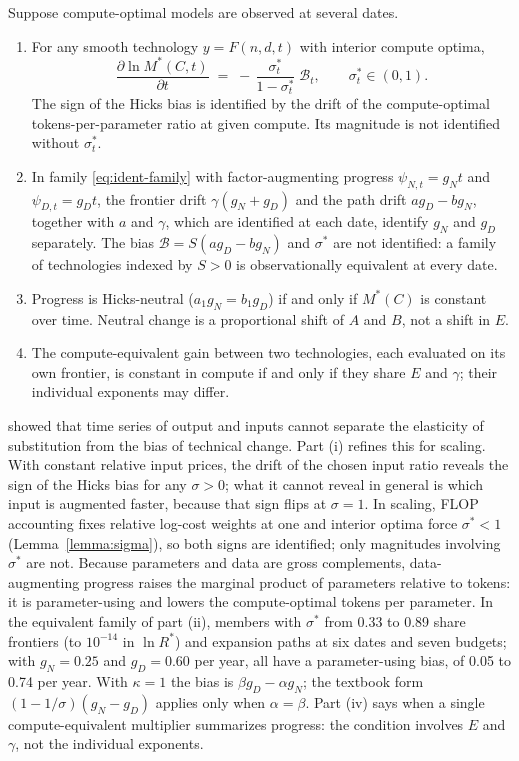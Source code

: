 \begin{proposition}\label{prop:dmr}
Suppose compute-optimal models are observed at several dates.
\begin{enumerate}
\item[(i)] For any smooth technology $y=F(n,d,t)$ with interior compute optima,
\begin{equation}\label{eq:ident-drift}
\frac{\partial\ln M^*(C,t)}{\partial t}\;=\;-\,\frac{\sigma^*_t}{1-\sigma^*_t}\;\mathcal B_t,\qquad\sigma^*_t\in(0,1).
\end{equation}
The sign of the Hicks bias is identified by the drift of the compute-optimal tokens-per-parameter ratio at given compute.
Its magnitude is not identified without $\sigma^*_t$.
\item[(ii)] In family \eqref{eq:ident-family} with factor-augmenting progress $\psi_{N,t}=g_Nt$ and $\psi_{D,t}=g_Dt$,
the frontier drift $\gamma(g_N+g_D)$ and the path drift $ag_D-bg_N$, together with $a$ and $\gamma$, which are
identified at each date, identify $g_N$ and $g_D$ separately. The bias
$\mathcal B=S(ag_D-bg_N)$ and $\sigma^*$ are not identified: a family of technologies indexed by $S>0$ is
observationally equivalent at every date.
\item[(iii)] Progress is Hicks-neutral ($a_1g_N=b_1g_D$) if and only if $M^*(C)$ is constant over time. Neutral change is
a proportional shift of $A$ and $B$, not a shift in $E$.
\item[(iv)] The compute-equivalent gain between two technologies, each evaluated on its own frontier, is constant in
compute if and only if they share $E$ and $\gamma$; their individual exponents may differ.
\end{enumerate}
\end{proposition}

\citet[hereafter DMR]{diamond1978measurement} showed that time series of output and inputs cannot separate the
elasticity of substitution from the bias of technical change. Part (i) refines this for scaling. With constant relative
input prices, the drift of the chosen input ratio reveals the sign of the Hicks bias for any $\sigma>0$; what it cannot
reveal in general is which input is augmented faster, because that sign flips at $\sigma=1$. In scaling, FLOP
accounting fixes relative log-cost weights at one and interior optima force $\sigma^*<1$ (Lemma~\ref{lemma:sigma}), so
both signs are identified; only magnitudes involving $\sigma^*$ are not. Because parameters and data are gross
complements, data-augmenting progress raises the marginal product of parameters relative to tokens: it is
parameter-using and lowers the compute-optimal tokens per parameter. In the equivalent family of part (ii), members with
$\sigma^*$ from 0.33 to 0.89 share frontiers (to $10^{-14}$ in $\ln R^*$) and expansion paths at six dates and seven
budgets; with $g_N=0.25$ and $g_D=0.60$ per year, all have a parameter-using bias, of 0.05 to 0.74 per year. With
$\kappa=1$ the bias is $\beta g_D-\alpha g_N$; the textbook form $(1-1/\sigma)(g_N-g_D)$ applies only when
$\alpha=\beta$. Part (iv) says when a single compute-equivalent multiplier summarizes progress: the condition involves
$E$ and $\gamma$, not the individual exponents.

